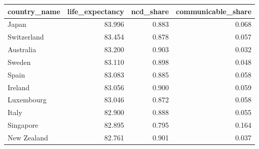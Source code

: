 \begin{tabular}{lrrr}
\toprule
country_name & life_expectancy & ncd_share & communicable_share \\
\midrule
Japan & 83.996 & 0.883 & 0.068 \\
Switzerland & 83.454 & 0.878 & 0.057 \\
Australia & 83.200 & 0.903 & 0.032 \\
Sweden & 83.110 & 0.898 & 0.048 \\
Spain & 83.083 & 0.885 & 0.058 \\
Ireland & 83.056 & 0.900 & 0.059 \\
Luxembourg & 83.046 & 0.872 & 0.058 \\
Italy & 82.900 & 0.888 & 0.055 \\
Singapore & 82.895 & 0.795 & 0.164 \\
New Zealand & 82.761 & 0.901 & 0.037 \\
\bottomrule
\end{tabular}
